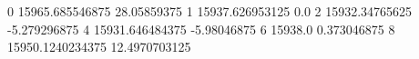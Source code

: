 0 15965.685546875 28.05859375
1 15937.626953125 0.0
2 15932.34765625 -5.279296875
4 15931.646484375 -5.98046875
6 15938.0 0.373046875
8 15950.1240234375 12.4970703125
